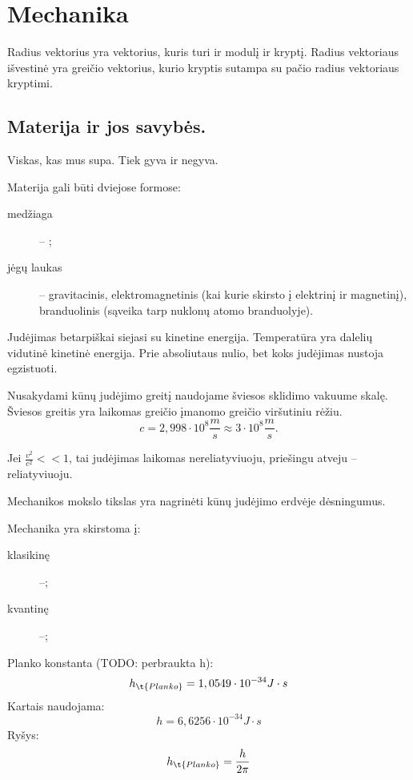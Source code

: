 \chapter{Mechanika}

Radius vektorius yra vektorius, kuris turi ir modulį ir kryptį.
Radius vektoriaus išvestinė yra greičio vektorius, kurio kryptis
sutampa su pačio radius vektoriaus kryptimi.

\section{Materija ir jos savybės.}

\begin{defn}[Materija]
  Viskas, kas mus supa. Tiek gyva ir negyva.
\end{defn}

Materija gali būti dviejose formose:
\begin{description}
  \item[medžiaga] – ;
  \item[jėgų laukas] – gravitacinis, elektromagnetinis (kai kurie skirsto
    į elektrinį ir magnetinį), branduolinis (sąveika tarp nuklonų
    atomo branduolyje).
\end{description}

Judėjimas betarpiškai siejasi su kinetine energija. Temperatūra yra
dalelių vidutinė kinetinė energija. Prie absoliutaus nulio, bet koks
judėjimas nustoja egzistuoti.

Nusakydami kūnų judėjimo greitį naudojame šviesos sklidimo vakuume skalę.
Šviesos greitis yra laikomas greičio įmanomo greičio viršutiniu 
rėžiu.
\begin{equation*}
  c = 2,998 \cdot 10^{8} \frac{m}{s} \approx 3 \cdot 10 ^{8} \frac{m}{s}.
\end{equation*}

Jei $\frac{v^{2}}{c^{2}} << 1$, tai judėjimas laikomas nereliatyviuoju,
priešingu atveju – reliatyviuoju.

Mechanikos mokslo tikslas yra nagrinėti kūnų judėjimo erdvėje
dėsningumus.

Mechanika yra skirstoma į:
\begin{description}
  \item[klasikinę] –;
  \item[kvantinę] –;
\end{description}

Planko konstanta (TODO: perbraukta h):
\begin{equation*}
  h_{\t{Planko}} = 1,0549 \cdot 10 ^{-34} J \cdot s
\end{equation*}
Kartais naudojama:
\begin{equation*}
  h = 6,6256 \cdot 10 ^{-34} J \cdot s
\end{equation*}
Ryšys:
\begin{equation*}
  h_{\t{Planko}} = \frac{h}{2 \pi}
\end{equation*}


